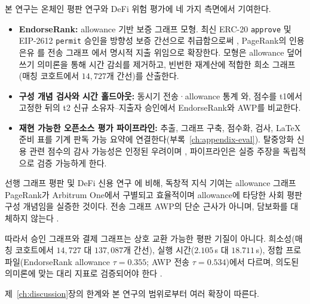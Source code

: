 
본 연구는 온체인 평판 연구와 DeFi 위험 평가에 네 가지 측면에서 기여한다.
\begin{itemize}
\item \textbf{EndorseRank:} allowance 기반 보증 그래프 모형. 최신 ERC-20 \texttt{approve} 및 EIP-2612 \texttt{permit} 승인을 방향성 보증 간선으로 취급함으로써 , PageRank의 인용 은유 를 전송 그래프 에서 명시적 지출 위임으로 확장한다. 모형은 allowance 덮어쓰기 의미론을 통해 시간 감쇠를 제거하고, 빈번한 재계산에 적합한 희소 그래프(매칭 코호트에서 $14{,}727$개 간선)를 산출한다.
\item \textbf{구성 개념 검사와 시간 홀드아웃:} 동시기 전송·allowance 통계 와, 점수를 t1에서 고정한 뒤의 t2 신규 소유자--지출자 승인에서 EndorseRank와 AWP를 비교한다.
\item \textbf{재현 가능한 오픈소스 평가 파이프라인:} 추출, 그래프 구축, 점수화, 검사, LaTeX 준비 표를 기계 판독 가능 요약에 연결한다(부록~\ref{ch:appendix-eval}). 탈중앙화 신용 관련 점수의 감사 가능성은 인정된 우려이며 , 파이프라인은 실증 주장을 독립적으로 검증 가능하게 한다.
\end{itemize}

선행 그래프 평판 및 DeFi 신용 연구 에 비해, 독창적 지식 기여는 allowance 그래프 PageRank가 Arbitrum One에서 구별되고 효율적이며 allowance에 타당한 사회 평판 구성 개념임을 실증한 것이다. 전송 그래프 AWP의 단순 근사가 아니며, 담보화를 대체하지 않는다 .

따라서 승인 그래프와 결제 그래프는 상호 교환 가능한 평판 기질이 아니다. 희소성(매칭 코호트에서 $14{,}727$ 대 $137{,}087$개 간선), 실행 시간($2.105$\,s 대 $18.711$\,s), 정합 프로파일(EndorseRank allowance $\tau=0.355$; AWP 전송 $\tau=0.534$)에서 다르며, 의도된 의미론에 맞는 대리 지표로 검증되어야 한다 .


제~\ref{ch:discussion}장의 한계와 본 연구의 범위로부터 여러 확장이 따른다.


